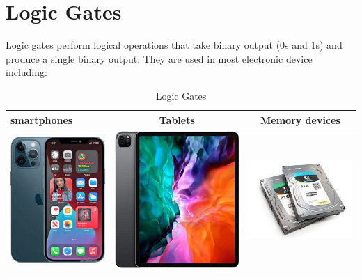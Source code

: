 \documentclass{article}
\begin{document}
\section{Logic Gates}
Logic gates perform logical operations that take binary output (0s and 1s) and produce a single binary output. They are used in most electronic device including:

\begin{table}[h!]
	\begin{center}
		\caption{Logic Gates}
		\label{tab:table1}
		\begin{tabular}{|l|c|c|}
			\hline
			smartphones
			&
			Tablets
			&
			Memory devices
			\\
		  \hline
		  \includegraphics[width=0.2\linewidth]{picture1}
		  &
		  \includegraphics[width=0.25\linewidth]{picture2}
		  &
		  \includegraphics[width=0.2\linewidth]{picture3}
		  \\
		    \hline
		    
	 \end{tabular}    	
 \end{center}
\end{table}
\end{document}

